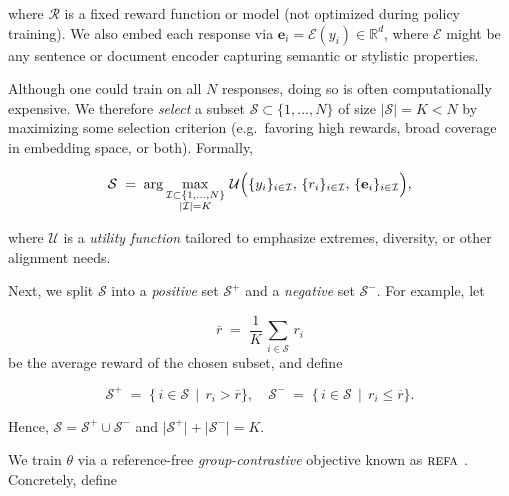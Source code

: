 \vspace{-0.1in}
where \(\mathcal{R}\) is a fixed reward function or model (not optimized during policy training). We also embed each response via \(\mathbf{e}_i = \mathcal{E}(y_i)\in \mathbb{R}^d\), where \(\mathcal{E}\) might be any sentence or document encoder capturing semantic or stylistic properties.

\vspace{-0.1in}
Although one could train on all \(N\) responses, doing so is often computationally expensive. We therefore \emph{select} a subset \(\mathcal{S}\subset \{1,\dots,N\}\) of size \(\lvert\mathcal{S}\rvert = K < N\) by maximizing some selection criterion (e.g.\ favoring high rewards, broad coverage in embedding space, or both). Formally,

\vspace{-0.15in}
\begin{equation}
\label{eq:subset_selection}
\mathcal{S}
\;=\;
\arg\max_{\substack{\mathcal{I}\subset\{1,\dots,N\} \\ \lvert\mathcal{I}\rvert = K}}
\,\mathcal{U}\Bigl(\{y_i\}_{i\in\mathcal{I}},\, \{r_i\}_{i\in\mathcal{I}},\, \{\mathbf{e}_i\}_{i\in\mathcal{I}}\Bigr),
\end{equation}

\vspace{-0.1in}
where \(\mathcal{U}\) is a \emph{utility function} tailored to emphasize extremes, diversity, or other alignment needs.

\vspace{-0.1in}
Next, we split \(\mathcal{S}\) into a \emph{positive} set \(\mathcal{S}^+\) and a \emph{negative} set \(\mathcal{S}^-\). For example, let 

\vspace{-0.05in}
\[
\overline{r} \;=\;
\frac{1}{K}\,\sum_{i\in \mathcal{S}}\,r_i
\]
\vspace{-0.05in}
be the average reward of the chosen subset, and define

\vspace{-0.05in}
\[
\mathcal{S}^+
\;=\;
\{\,i\in \mathcal{S}\,\mid\,r_i > \overline{r}\},
\quad
\mathcal{S}^- 
\;=\;
\{\,i\in \mathcal{S}\,\mid\,r_i \le \overline{r}\}.
\]

\vspace{-0.05in}
Hence, \(\mathcal{S} = \mathcal{S}^+\cup \mathcal{S}^-\) and \(\lvert \mathcal{S}^+\rvert + \lvert \mathcal{S}^-\rvert = K\).

We train \(\theta\) via a reference-free \emph{group-contrastive} objective known as \(\textsc{refa}\) \citep{gupta2024refa}. Concretely, define

